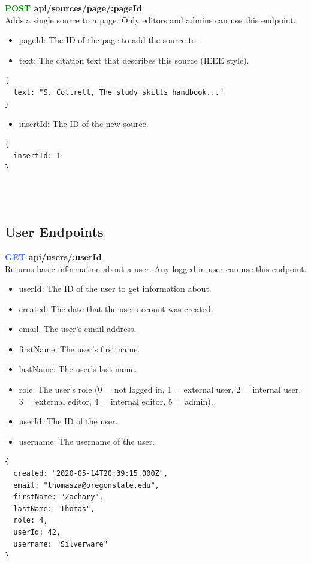 \documentclass[onecolumn, draftclsnofoot,10pt, compsoc, usenames, dvipsnames]{IEEEtran}
\begin{document}
\noindent
\textbf{\textcolor{Green}{POST} api/sources/page/:pageId} \\
Adds a single source to a page. Only editors and admins can use this endpoint.
\begin{itemize}
    \item pageId: The ID of the page to add the source to.
    \item text: The citation text that describes this source (IEEE style).
\end{itemize}
\begin{lstlisting}[caption=Example Request Body]
{
  text: "S. Cottrell, The study skills handbook..."
}
\end{lstlisting}
\begin{itemize}
    \item insertId: The ID of the new source.
\end{itemize}
\begin{lstlisting}[caption=Example Response]
{ 
  insertId: 1
}
\end{lstlisting}
\\~\\


\subsection{User Endpoints}


\noindent
\textbf{\textcolor{RoyalBlue}{GET} api/users/:userId} \\
Returns basic information about a user. Any logged in user can use this endpoint.
\begin{itemize}
    \item userId: The ID of the user to get information about.
    \item created: The date that the user account was created.
    \item email. The user's email address.
    \item firstName: The user's first name.
    \item lastName: The user's last name.
    \item role: The user's role (0 = not logged in, 1 = external user, 2 = internal user, 3 = external editor, 4 = internal editor, 5 = admin).
    \item userId: The ID of the user.
    \item username: The username of the user.
\end{itemize}
\begin{lstlisting}[caption=Example Response]
{
  created: "2020-05-14T20:39:15.000Z",
  email: "thomasza@oregonstate.edu",
  firstName: "Zachary",
  lastName: "Thomas",
  role: 4,
  userId: 42,
  username: "Silverware"
}
\end{lstlisting}
\\~\\
\end{document}
